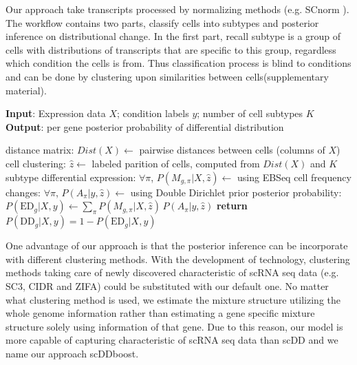 \documentclass[11pt]{amsart}
\begin{document}
Our approach take transcripts processed by normalizing methods (e.g. SCnorm \cite{ref:Rhonda}). 
The workflow contains two parts, classify cells into subtypes and posterior inference on distributional change. In the first part, recall subtype is a group of cells with distributions of transcripts that are specific to this group, regardless which condition the cells is from. Thus classification process is blind to conditions and can be done by clustering upon similarities between cells(supplementary material). 
\begin{algorithm}
\caption{}\label{alg:scDDboost}
\raggedright\hspace*{\algorithmicindent} \textbf{Input}: Expression data $X$; condition labels $y$; number of cell subtypes $K$ \\
\hspace*{\algorithmicindent} \textbf{Output}: per gene posterior probability of differential distribution
\begin{algorithmic}[1]
\State distance matrix: $Dist(X) \gets$ pairwise distances between cells (columns of $X$)
\State cell clustering: $\hat z \gets$ labeled parition of cells, computed from $Dist(X)$ and $K$
\State subtype differential expression: $\forall \pi$,  $P(M_{g,\pi} | X, \hat z)\gets$ using EBSeq\cite{ref:Leng}
\State cell frequency changes: $\forall \pi$, $P(A_\pi | y, \hat z)\gets$ using Double Dirichlet prior
\State posterior probability: $P(\text{ED}_g | X, y)\gets \underset{\pi}{\sum}P(M_{g,\pi} | X, \hat z) \,
 P(A_\pi | y, \hat z)$
\State \textbf{return} $P(\text{DD}_g |X, y)=1-P(\text{ED}_g| X,y)$
\EndProcedure
\end{algorithmic}
\end{algorithm}

One advantage of our approach is that the posterior inference can be incorporate with different clustering methods. With the development of technology, clustering methods taking care of newly discovered characteristic of scRNA seq data (e.g. SC3\cite{sc3}, CIDR\cite{CIDR} and ZIFA\cite{ZIFA}) could be substituted with our default one. No matter what clustering method is used, we estimate the mixture structure utilizing the whole genome information rather than estimating a gene specific mixture structure solely using information of that gene. Due to this reason, our model is more capable of capturing characteristic of scRNA seq data than scDD and we name our approach scDDboost. 
\end{document}
